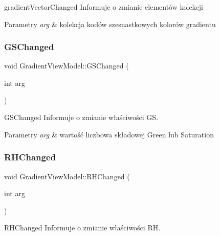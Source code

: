 gradient\+Vector\+Changed Informuje o zmianie elementów kolekcji 


\begin{DoxyParams}{Parametry}
{\em arg} & kolekcja kodów szesnastkowych kolorów gradientu \\
\hline
\end{DoxyParams}
\mbox{\label{class_gradient_view_model_a09e3fbfaa0b3f501ae7637736b5dcdc5}} 
\subsubsection{\texorpdfstring{G\+S\+Changed}{GSChanged}}
{\footnotesize\ttfamily void Gradient\+View\+Model\+::\+G\+S\+Changed (\begin{DoxyParamCaption}\item[{int}]{arg }\end{DoxyParamCaption})\hspace{0.3cm}{\ttfamily [signal]}}



G\+S\+Changed Informuje o zmianie właściwości GS. 


\begin{DoxyParams}{Parametry}
{\em arg} & wartość liczbowa składowej Green lub Saturation \\
\hline
\end{DoxyParams}
\mbox{\label{class_gradient_view_model_a50c4f64eb680f0efdb80b1e6888fc51c}} 
\subsubsection{\texorpdfstring{R\+H\+Changed}{RHChanged}}
{\footnotesize\ttfamily void Gradient\+View\+Model\+::\+R\+H\+Changed (\begin{DoxyParamCaption}\item[{int}]{arg }\end{DoxyParamCaption})\hspace{0.3cm}{\ttfamily [signal]}}



R\+H\+Changed Informuje o zmianie właściwości RH. 


